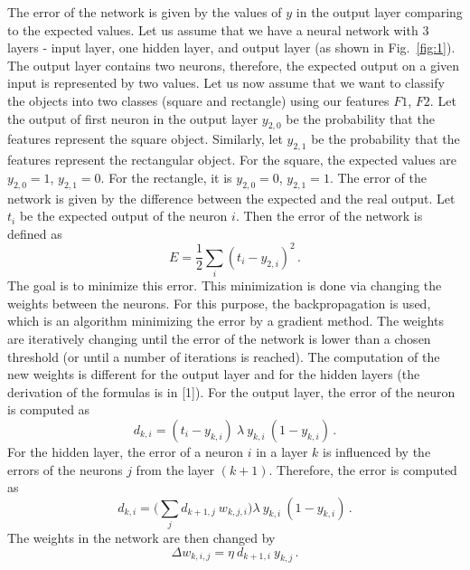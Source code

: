 \documentclass[12pt]{article}
\begin{document}
The error of the network is given by the values of $y$ in the output layer comparing to the expected values.
Let us assume that we have a neural network with $3$ layers - input layer, one hidden layer, and output layer (as shown in Fig.~\ref{fig:1}).
The output layer contains two neurons, therefore, the expected output on a given input is represented by two values.
Let us now assume that we want to classify the objects into two classes (square and rectangle) using our features $F1$, $F2$.
Let the output of first neuron in the output layer $y_{2,0}$ be the probability that the features represent the square object.
Similarly, let $y_{2,1}$ be the probability that the features represent the rectangular object.
For the square, the expected values are $y_{2,0} = 1$, $y_{2,1}=0$.
For the rectangle, it is $y_{2,0} = 0$, $y_{2,1}=1$.
The error of the network is given by the difference between the expected and the real output.
Let $t_i$ be the expected output of the neuron $i$.
Then the error of the network is defined as
\begin{equation}
\label{eq:3}
E = \frac{1}{2} \sum_{i}(t_i - y_{2,i})^2 \, .
\end{equation}
The goal is to minimize this error.
This minimization is done via changing the weights between the neurons.
For this purpose, the backpropagation is used, which is an algorithm minimizing the error by a gradient method.
The weights are iteratively changing until the error of the network is lower than a chosen threshold (or until a number of iterations is reached).
The computation of the new weights is different for the output layer and for the hidden layers (the derivation of the formulas is in [1]).
For the output layer, the error of the neuron is computed as
\begin{equation}
\label{eq:4}
d_{k,i} = (t_{i} - y_{k,i}) \: \lambda \: y_{k,i} \: (1-y_{k,i}) \, .
\end{equation}
For the hidden layer, the error of a neuron $i$ in a layer $k$ is influenced by the errors of the neurons $j$ from the layer $(k+1)$.
Therefore, the error is computed as
\begin{equation}
\label{eq:5}
d_{k,i} = \Big( \sum_j d_{k+1,j} \: w_{k,j,i} \Big) \lambda \: y_{k,i} \: (1-y_{k,i}) \, .
\end{equation}
The weights in the network are then changed by 
\begin{equation}
\label{eq:6}
\Delta w_{k,i,j} = \eta \: d_{k+1,i} \: y_{k,j} \, .
\end{equation}
\end{document}

